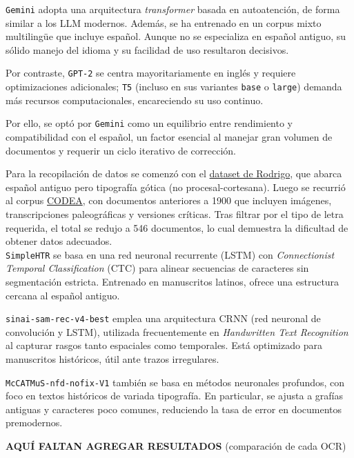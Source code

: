 \documentclass[11pt,a4paper]{article}
\begin{document}
\texttt{Gemini} adopta una arquitectura \textit{transformer} basada en autoatención, de forma similar a los LLM modernos. Además, se ha entrenado en un corpus mixto multilingüe que incluye español. Aunque no se especializa en español antiguo, su sólido manejo del idioma y su facilidad de uso resultaron decisivos.

Por contraste, \texttt{GPT-2} se centra mayoritariamente en inglés y requiere optimizaciones adicionales; \texttt{T5} (incluso en sus variantes \texttt{base} o \texttt{large}) demanda más recursos computacionales, encareciendo su uso continuo.

Por ello, se optó por \texttt{Gemini} como un equilibrio entre rendimiento y compatibilidad con el español, un factor esencial al manejar gran volumen de documentos y requerir un ciclo iterativo de corrección.

Para la recopilación de datos se comenzó con el \href{https://zenodo.org/records/1490009/files/Rodrigo%20corpus%201.0.0.tar.gz?download=1}{dataset de Rodrigo}, que abarca español antiguo pero tipografía gótica (no procesal-cortesana). Luego se recurrió al corpus \href{https://corpuscodea.es/}{CODEA}, con documentos anteriores a 1900 que incluyen imágenes, transcripciones paleográficas y versiones críticas. Tras filtrar por el tipo de letra requerida, el total se redujo a 546 documentos, lo cual demuestra la dificultad de obtener datos adecuados.\\

\texttt{SimpleHTR} se basa en una red neuronal recurrente (LSTM) con \textit{Connectionist Temporal Classification} (CTC) para alinear secuencias de caracteres sin segmentación estricta. Entrenado en manuscritos latinos, ofrece una estructura cercana al español antiguo.

\texttt{sinai-sam-rec-v4-best} emplea una arquitectura CRNN (red neuronal de convolución y LSTM), utilizada frecuentemente en \textit{Handwritten Text Recognition} al capturar rasgos tanto espaciales como temporales. Está optimizado para manuscritos históricos, útil ante trazos irregulares.

\texttt{McCATMuS-nfd-nofix-V1} también se basa en métodos neuronales profundos, con foco en textos históricos de variada tipografía. En particular, se ajusta a grafías antiguas y caracteres poco comunes, reduciendo la tasa de error en documentos premodernos.

\textbf{AQUÍ FALTAN AGREGAR RESULTADOS} (comparación de cada OCR)\\
\end{document}
